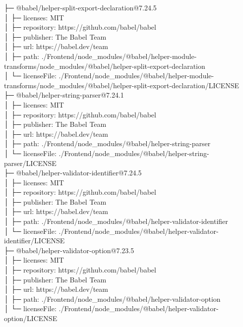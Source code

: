 \documentclass[
    paper=a4,
    twoside=false,
    parskip=half,
    listof=entryprefix,
    listof=totoc,
    index=totoc,
    bibliography=totoc,
    headsepline,
]{scrbook}
\begin{document}
    ├─ @babel/helper-split-export-declaration@7.24.5\\
    │  ├─ licenses: MIT\\
    │  ├─ repository: https://github.com/babel/babel\\
    │  ├─ publisher: The Babel Team\\
    │  ├─ url: https://babel.dev/team\\
    │  ├─ path: ./Frontend/node\_modules/@babel/helper-module-transforms/node\_modules/@babel/helper-split-export-declaration\\
    │  └─ licenseFile: ./Frontend/node\_modules/@babel/helper-module-transforms/node\_modules/@babel/helper-split-export-declaration/LICENSE\\
    ├─ @babel/helper-string-parser@7.24.1\\
    │  ├─ licenses: MIT\\
    │  ├─ repository: https://github.com/babel/babel\\
    │  ├─ publisher: The Babel Team\\
    │  ├─ url: https://babel.dev/team\\
    │  ├─ path: ./Frontend/node\_modules/@babel/helper-string-parser\\
    │  └─ licenseFile: ./Frontend/node\_modules/@babel/helper-string-parser/LICENSE\\
    ├─ @babel/helper-validator-identifier@7.24.5\\
    │  ├─ licenses: MIT\\
    │  ├─ repository: https://github.com/babel/babel\\
    │  ├─ publisher: The Babel Team\\
    │  ├─ url: https://babel.dev/team\\
    │  ├─ path: ./Frontend/node\_modules/@babel/helper-validator-identifier\\
    │  └─ licenseFile: ./Frontend/node\_modules/@babel/helper-validator-identifier/LICENSE\\
    ├─ @babel/helper-validator-option@7.23.5\\
    │  ├─ licenses: MIT\\
    │  ├─ repository: https://github.com/babel/babel\\
    │  ├─ publisher: The Babel Team\\
    │  ├─ url: https://babel.dev/team\\
    │  ├─ path: ./Frontend/node\_modules/@babel/helper-validator-option\\
    │  └─ licenseFile: ./Frontend/node\_modules/@babel/helper-validator-option/LICENSE\\
\end{document}
